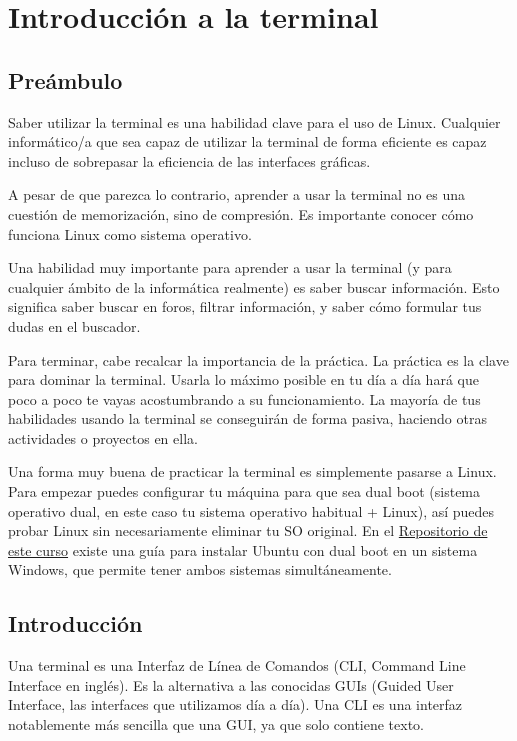 \chapter{Introducción a la terminal}
\section{Preámbulo}
Saber utilizar la terminal es una habilidad clave para el uso de Linux. Cualquier informático/a que sea capaz de utilizar la terminal de forma eficiente es capaz incluso de sobrepasar la eficiencia de las interfaces gráficas.

A pesar de que parezca lo contrario, aprender a usar la terminal no es una cuestión de memorización, sino de compresión. Es importante conocer cómo funciona Linux como sistema operativo.

Una habilidad muy importante para aprender a usar la terminal (y para cualquier ámbito de la informática realmente) es saber buscar información. Esto significa saber buscar en foros, filtrar información, y saber cómo formular tus dudas en el buscador.

Para terminar, cabe recalcar la importancia de la práctica. La práctica es la clave para dominar la terminal. Usarla lo máximo posible en tu día a día hará que poco a poco te vayas acostumbrando a su funcionamiento. La mayoría de tus habilidades usando la terminal se conseguirán de forma pasiva, haciendo otras actividades o proyectos en ella.

Una forma muy buena de practicar la terminal es simplemente pasarse a Linux. Para empezar puedes configurar tu máquina para que sea dual boot (sistema operativo dual, en este caso tu sistema operativo habitual + Linux), así puedes probar Linux sin necesariamente eliminar tu SO original. En el \href{https://github.com/markelmencia/fundamentos-gnulinux}{Repositorio de este curso} existe una guía para instalar Ubuntu con dual boot en un sistema Windows, que permite tener ambos sistemas simultáneamente.

\section{Introducción}
Una terminal es una Interfaz de Línea de Comandos (CLI, Command Line Interface en inglés). Es la alternativa a las conocidas GUIs (Guided User Interface, las interfaces que utilizamos día a día). Una CLI es una interfaz notablemente más sencilla que una GUI, ya que solo contiene texto.

